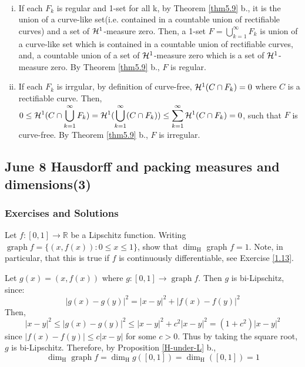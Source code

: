 \begin{customsol}{5.8} $ $
    \begin{enumerate}[i.]
    \item If each $F_k$ is regular and 1-set for all k, by Theorem \ref{thm5.9} b., it is the union of a curve-like set(i.e. contained in a countable union of rectifiable curves) and a set of $\mathcal{H}^1$-measure zero. Then, a 1-set $F = \displaystyle \bigcup_{k=1}^\infty F_k$ is union of a curve-like set which is contained in a countable union of rectifiable curves, and, a countable union of a set of $\mathcal{H}^1$-measure zero which is a set of $\mathcal{H}^1$-measure zero. By Theorem \ref{thm5.9} b., $F$ is regular. 
    \item If each $F_k$ is irrgular, by definition of curve-free, $\mathcal{H}^1(C\cap F_k) = 0$ where $C$ is a rectifiable curve. Then, $\displaystyle 0\leq\mathcal{H}^1(C\cap \bigcup_{k=1}^\infty F_k) = \mathcal{H}^1(\bigcup_{k=1}^\infty (C\cap F_k))\leq \sum_{k=1}^\infty \mathcal{H}^1(C\cap F_k) = 0$, such that $F$ is curve-free. By Theorem \ref{thm5.9} b., $F$ is irregular. 
\end{enumerate}

\end{customsol}

\newpage

\subsection{June 8 Hausdorff and packing measures and dimensions(3)}
\subsubsection{Exercises and Solutions}
\begin{customexercise}{3.7}
    Let $f:[0,1] \rightarrow \mathbb{R}$ be a Lipschitz function. Writing $\operatorname{graph} f=\{(x, f(x)): 0 \leq x \leq 1\}$, show that $\operatorname{dim}_{\mathrm{H}}$ graph $f=1 .$ Note, in
particular, that this is true if $f$ is continuously differentiable, see Exercise \ref{1.13}.
\end{customexercise}
\begin{customsol}{3.7}
   Let $g(x)=(x, f(x))$ where $g:[0,1] \rightarrow \operatorname{graph} f$. Then $g$ is bi-Lipschitz, since:
$$
|g(x)-g(y)|^{2}=|x-y|^{2}+|f(x)-f(y)|^{2}
$$
Then,
$$
|x-y|^{2} \leq|g(x)-g(y)|^{2} \leq|x-y|^{2}+c^{2}|x-y|^{2}=\left(1+c^{2}\right)|x-y|^{2}
$$
since $|f(x)-f(y)| \leq c|x-y|$ for some $c>0$. Thus by taking the square root, $g$ is bi-Lipschitz. Therefore, by Proposition \ref{H-under-L} b., 
$$\operatorname{dim}_{\mathrm{H}} \operatorname{graph} f = \operatorname{dim}_{\mathrm{H}} g([0,1]) = \operatorname{dim}_{\mathrm{H}}([0,1]) = 1$$
\end{customsol}


